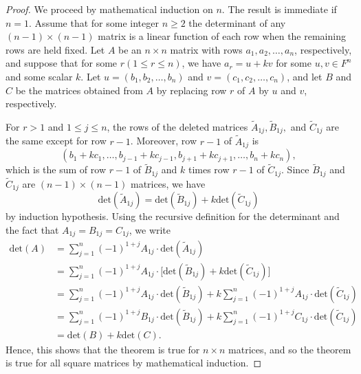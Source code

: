 \begin{proof}
We proceed by mathematical induction on \( n  \). The result is immediate if \( n = 1  \). Assume that for some integer \( n \geq 2  \) the determinant of any \( (n-1) \times (n-1) \) matrix is a linear function of each row when the remaining rows are held fixed. Let \( A  \) be an \( n \times n  \) matrix with rows \( {a}_{1}, {a}_{2}, \dots, {a}_{n} \), respectively, and suppose that for some \( r (1 \leq r \leq n) \), we have \( {a}_{r} = u + kv  \) for some \( u,v \in F^{n} \) and some scalar \( k  \). Let \( u = ({b}_{1}, {b}_{2}, \dots, {b}_{n}) \) and \( v = ({c}_{1}, {c}_{2}, \dots, {c}_{n}) \), and let \( B  \) and \( C \) be the matrices obtained from \( A  \) by replacing row \( r  \) of \( A  \) by \( u \) and \( v  \), respectively.

For \( r > 1  \) and \( 1 \leq j \leq  n \), the rows of the deleted matrices \( {\tilde{A}}_{1j}, {\tilde{B}}_{1j},  \) and \( {\tilde{C}}_{1j} \) are the same except for row \( r - 1  \). Moreover, row \( r - 1  \) of \( {\tilde{A}}_{1j}  \) is 
\[ ({b}_{1} + {kc}_{1}, \dots, {b}_{j-1} + {kc}_{j-1}, {b}_{j+1} + {kc}_{j+1}, \dots, {b}_{n} + {kc}_{n}), \]
which is the sum of row \( r - 1  \) of \( {\tilde{B}}_{1j} \) and \( k  \) times row \( r -1  \) of \( {\tilde{C}}_{1j} \). Since \( {\tilde{B}}_{1j} \) and \( {\tilde{C}}_{1j} \) are \( (n-1) \times (n-1) \) matrices, we have
\[  \text{det}({\tilde{A}}_{1j}) = \text{det}({\tilde{B}}_{1j}) + k \text{det}({\tilde{C}}_{1j}) \]
by induction hypothesis. Using the recursive definition for the determinant and the fact that \( {A}_{1j} = {B}_{1j} = {C}_{1j} \), we write
\begin{align*}
    \text{det}(A) & = \sum_{ j=1 }^{ n } (-1)^{1 +j} {A}_{1j} \cdot \text{det}({\tilde{A}}_{1j}) \\
                  &= \sum_{ j=1 }^{ n } (-1)^{1+j} {A}_{1j} \cdot \Big[ \text{det}({\tilde{B}}_{1j}) + k \text{det}({\tilde{C}}_{1j}) \Big] \\
                  &= \sum_{ j=1 }^{ n } (-1)^{1+j} {A}_{1j} \cdot \text{det}({\tilde{B}}_{1j}) + k \sum_{ j=1 }^{ n } (-1)^{1+j} {A}_{1j} \cdot \text{det}({\tilde{C}}_{1j})\\
                  &= \sum_{ j=1 }^{ n } (-1)^{1+j} {B}_{1j} \cdot \text{det}({\tilde{B}}_{1j}) + k \sum_{ j=1 }^{ n } (-1)^{1+j} {C}_{1j} \cdot \text{det}({\tilde{C}}_{1j})\\
                  &= \text{det}(B) + k \text{det}(C).
\end{align*}
Hence, this shows that the theorem is true for \( n \times n  \) matrices, and so the theorem is true for all square matrices by mathematical induction. 
\end{proof}

